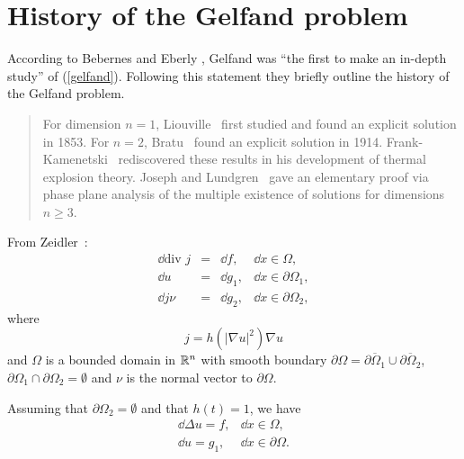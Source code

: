 %
%
\section{History of the Gelfand problem}
%
%

According to Bebernes and Eberly \cite[p.46]{bebernes:mpc89},
Gelfand was ``the first to make an in-depth
study'' of (\ref{gelfand}). Following this statement they briefly
outline the history of the Gelfand problem.
\par
\begin{singlespace}
\begin{quote}
For dimension $n=1$, Liouville~\cite{liouville:edp53} first studied and
found an explicit solution in 1853. For $n=2$, Bratu~\cite{bratu:ein14}
found an explicit solution in 1914.  Frank-Kamenetski~\cite{frank:dhe55}
rediscovered these results in his development of thermal explosion
theory.  Joseph and Lundgren~\cite{joseph:qdp73} gave an elementary
proof via phase plane analysis of the multiple existence of solutions
for dimensions $n\geq 3$.
\end{quote}
\end{singlespace}
\par


From Zeidler~\cite{zeidler:nfa88IIa}:
{\samepage
\begin{equation}\label{station}
\begin{array}{rcll}
\dd\mbox{div } j& = &\dd f, &\dd x\in\Omega ,\\[8pt]
\dd u& = & \dd g_1, & \dd x\in\partial\Omega_1 , \\[8pt]
\dd j\nu & = & \dd g_2, & \dd x\in\partial\Omega_2 ,
\end{array}
\end{equation} }
where
\begin{equation}\label{current}
j =  h(|\nabla u|^2)\nabla u
\end{equation}
and $\Omega$ is a bounded domain in ${\Bbb R}^n$ with
smooth boundary $\partial\Omega = \overline{\partial\Omega_1}\cup
\overline{\partial\Omega_2}$, $\partial\Omega_1 \cap
\partial\Omega_2 = \emptyset$ and $\nu$ is the normal vector to
$\partial\Omega$.

\begin{lem}
Assuming that $\partial\Omega_2 = \emptyset$ and that $h(t) = 1$, we
have $$
\begin{array}{lr}
\dd\Delta u = f, & \dd x\in\Omega ,\\[8pt]
\dd u =  g_1, & \dd x\in\partial\Omega .
\end{array}
$$
\end{lem}

